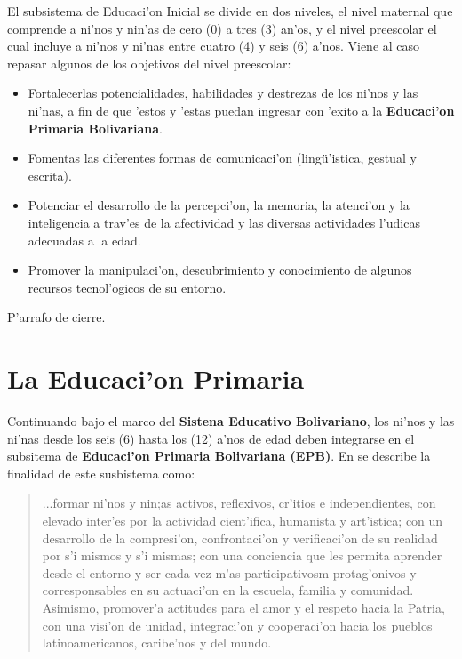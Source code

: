 El subsistema de Educaci'on Inicial se divide en dos niveles, el nivel maternal que comprende a ni'nos y nin'as de cero (0) a tres (3) an'os, y el nivel preescolar el cual incluye a ni'nos y ni'nas entre cuatro (4) y seis (6) a'nos. Viene al caso repasar algunos de los objetivos del nivel preescolar:

\begin{itemize}
	\item Fortalecerlas potencialidades, habilidades y destrezas de los ni'nos y las ni'nas, a fin de que 'estos y 'estas puedan ingresar con 'exito a la \textbf{Educaci'on Primaria Bolivariana}.
	\item Fomentas las diferentes formas de comunicaci'on (ling\"{u}'istica, gestual y escrita).
	\item Potenciar el desarrollo de la percepci'on, la memoria, la atenci'on y la inteligencia a trav'es de la afectividad y las diversas actividades l'udicas adecuadas a la edad.
	\item Promover la manipulaci'on, descubrimiento y conocimiento de algunos recursos tecnol'ogicos de su entorno.
\end{itemize}

{\color{red} P'arrafo de cierre.}

\section{La Educaci'on Primaria}
Continuando bajo el marco del \textbf{Sistena Educativo Bolivariano}, los ni'nos y las ni'nas desde los seis (6) hasta los (12) a'nos de edad deben integrarse en el subsitema de \textbf{Educaci'on Primaria Bolivariana (EPB)}. En \cite{CurriculoSEPB} se describe la finalidad de este susbistema como:

\begin{quotation}
	...formar ni'nos y nin;as activos, reflexivos, cr'itios e independientes, con elevado inter'es por la actividad cient'ifica, humanista y art'istica; con un desarrollo de la compresi'on, confrontaci'on y verificaci'on de su realidad por s'i mismos y s'i mismas; con una conciencia que les permita aprender desde el entorno y ser cada vez m'as participativosm protag'onivos y corresponsables en su actuaci'on en la escuela, familia y comunidad. Asimismo, promover'a actitudes para el amor y el respeto hacia la Patria, con una visi'on de unidad, integraci'on y cooperaci'on hacia los pueblos latinoamericanos, caribe'nos y del mundo.
\end{quotation}

